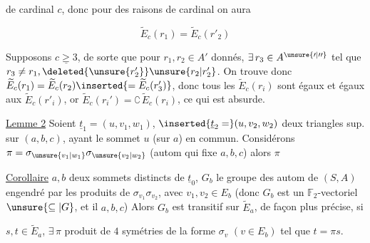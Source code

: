 de cardinal $c$, donc pour des raisons de cardinal on aura

\[ \widetilde E_c(r_1)=\widetilde E_c(r'_2) \]

Supposons $\underline{c\geq3}$, de sorte que pour $r_1,r_2\in A'$ donnés,  $\exists\,r_3\in A^{\unsure{\prime|\prime\prime}}$ tel que $r_3\neq r_1,\deleted{\unsure{r_2'}}\unsure{r_2|r'_2}$. On trouve donc $\widetilde E_c(r_1)=\widetilde E_c(r_2)\inserted{=\widetilde E_c(r'_3)}$, donc tous les $\widetilde E_c(r_i)$   sont égaux et égaux aux $\widetilde E_c(r'_i)$, or $\widetilde E_c(r_i')=\complement\,\widetilde E_c(r_i)$, ce qui est absurde.

\uline{Lemme 2} Soient  $\underline t_1=(u,v_1,w_1)$, $\inserted{\underline t_2=}(u,v_2,w_2)$ deux triangles sup. sur $(a,b,c)$, ayant le sommet $u$ (sur $a$) en commun. Considérons $\pi=\sigma_{\unsure{v_1|w_1}}\sigma_{\unsure{v_2|w_2}}$ (autom  qui fixe $a,b,c$) alors $\pi$  

\uline{Corollaire}   $a,b$ deux sommets distincts de $\underline t_0$, $G_b$ le  groupe  des autom de $(S,A)$ engendré par les produits de     $\sigma_{v_1}\sigma_{v_2}$, avec $v_1,v_2\in E_b$  (donc $G_b$ est un  $\mathbb F_2$-vectoriel$\unsure{\subseteq|G}$, et il  $a,b,c$) Alors $G_b$ est transitif sur $\widetilde E_a$, de façon plus précise, si

$s,t\in\widetilde E_a$, $\exists\,\pi$ \unsure{$\in$} produit de $4$  symétries de la forme $\sigma_v$ $(v\in E_b)$ tel que $t=\pi s$.


